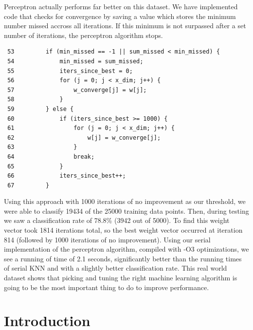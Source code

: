 \documentclass{article}
\begin{document}
Perceptron actually performs far better on this dataset. We have implemented code that checks for convergence by saving a value which stores the minimum number missed accross all iterations. If this minimum is not surpassed after a set number of iterations, the perceptron algorithm stops.
\begin{verbatim}
 53         if (min_missed == -1 || sum_missed < min_missed) {
 54             min_missed = sum_missed;
 55             iters_since_best = 0;
 56             for (j = 0; j < x_dim; j++) {
 57                 w_converge[j] = w[j];
 58             }
 59         } else {
 60             if (iters_since_best >= 1000) {
 61                 for (j = 0; j < x_dim; j++) {
 62                     w[j] = w_converge[j];
 63                 }
 64                 break;
 65             }
 66             iters_since_best++;
 67         }
\end{verbatim}

Using this approach with 1000 iterations of no improvement as our threshold, we were able to classify 19434 of the 25000 training data points. Then, during testing we saw a classification rate of 78.8\% (3942 out of 5000). To find this weight vector took 1814 iterations total, so the best weight vector occurred at iteration 814 (followed by 1000 iterations of no improvement). Using our serial implementation of the perceptron algorithm, compiled with -O3 optimizations, we see a running of time of 2.1 seconds, significantly better than the running times of serial KNN and with a slightly better classification rate. This real world dataset shows that picking and tuning the right machine learning algorithm is going to be the most important thing to do to improve performance.

\section{Introduction}
\end{document}
